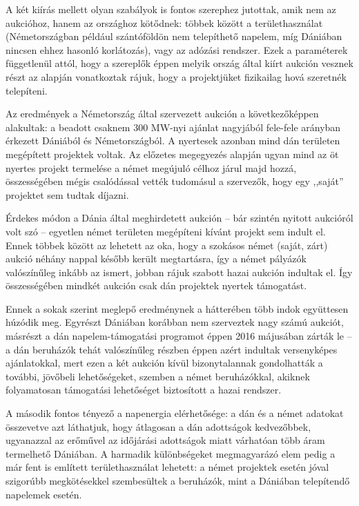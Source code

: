 \documentclass[twoside, magyar, showtrims]{corvinusphd}
\begin{document}
A két kiírás mellett olyan szabályok is fontos szerephez jutottak,
amik nem az aukcióhoz, hanem az országhoz kötődnek: többek között
a területhasználat (Németországban például szántóföldön nem telepíthető
napelem, míg Dániában nincsen ehhez hasonló korlátozás), vagy
az adózási rendszer. Ezek a paraméterek függetlenül attól, hogy
a szereplők éppen melyik ország által kiírt aukción vesznek részt
az alapján vonatkoztak rájuk, hogy a projektjüket fizikailag hová szeretnék telepíteni.

Az eredmények a Németország által szervezett aukción a következőképpen alakultak:
a beadott csaknem 300 MW-nyi ajánlat nagyjából fele-fele arányban érkezett
Dániából és Németországból. A nyertesek azonban mind dán területen
megépített projektek voltak. Az előzetes megegyezés alapján ugyan
mind az öt nyertes projekt termelése a német megújuló célhoz járul
majd hozzá, összességében mégis csalódással vették tudomásul a szervezők,
hogy egy ,,saját'' projektet sem tudtak díjazni.

Érdekes módon a Dánia által meghirdetett aukción -- bár szintén nyitott
aukcióról volt szó -- egyetlen német területen megépíteni kívánt projekt
sem indult el. Ennek többek között az lehetett az oka, hogy a szokásos
német (saját, zárt) aukció néhány nappal később került megtartásra,
így a német pályázók valószínűleg inkább az ismert, jobban rájuk
szabott hazai aukción indultak el. Így összességében mindkét aukción csak dán
projektek nyertek támogatást. 

Ennek a sokak szerint meglepő eredménynek a hátterében több 
indok együttesen húzódik meg. Egyrészt Dániában korábban nem szerveztek 
nagy számú aukciót, másrészt a dán napelem-támogatási
programot éppen 2016 májusában zárták le -- a dán beruházók
tehát valószínűleg részben éppen azért indultak versenyképes ajánlatokkal,
mert ezen a két aukción kívül bizonytalannak gondolhatták a további,
jövőbeli lehetőségeket, szemben a német beruházókkal, akiknek folyamatosan
támogatási lehetőséget biztosított a hazai rendszer.

A második fontos tényező a napenergia elérhetősége:
a dán és a német adatokat összevetve azt láthatjuk,
hogy átlagosan a dán adottságok kedvezőbbek, ugyanazzal az erőművel
az időjárási adottságok miatt várhatóan több áram termelhető Dániában.
A harmadik különbségeket megmagyarázó elem pedig a már fent is említett
területhasználat lehetett: a német projektek esetén jóval szigorúbb 
megkötésekkel szembesültek a beruházók, mint a Dániában telepítendő napelemek esetén.
\end{document}

